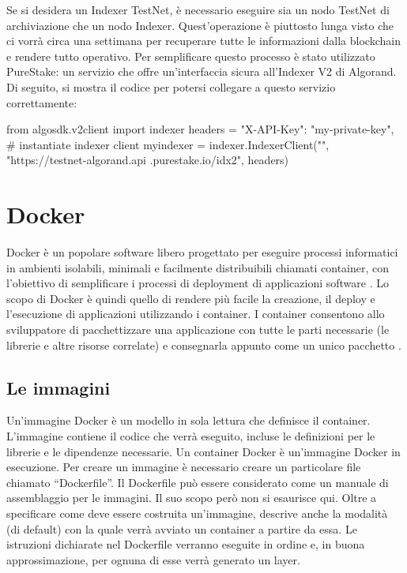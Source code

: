 Se si desidera un Indexer TestNet, è necessario eseguire sia un nodo TestNet di archiviazione che un nodo Indexer. Quest'operazione è piuttosto lunga visto che ci vorrà circa una settimana per recuperare tutte le informazioni dalla blockchain e rendere tutto operativo. Per semplificare questo processo è stato utilizzato PureStake: un servizio che offre un'interfaccia sicura all'Indexer V2 di Algorand. Di seguito, si mostra il codice per potersi collegare a questo servizio correttamente:

\begin{pythoncode}
from algosdk.v2client import indexer
headers = {
"X-API-Key": "my-private-key",
}
# instantiate indexer client
myindexer = indexer.IndexerClient("", "https://testnet-algorand.api
.purestake.io/idx2", headers)
\end{pythoncode}

\section{Docker}
Docker è un popolare software libero progettato per eseguire processi informatici in ambienti isolabili, minimali e facilmente distribuibili chiamati container, con l'obiettivo di semplificare i processi di deployment di applicazioni software \cite{docker}. Lo scopo di Docker è quindi quello di rendere più facile la creazione, il deploy e l'esecuzione di applicazioni utilizzando i container. I container consentono allo sviluppatore di pacchettizzare una applicazione con tutte le parti necessarie (le librerie e altre risorse correlate) e consegnarla appunto come un unico pacchetto \cite{docker1}.

\subsection{Le immagini}
Un'immagine Docker è un modello in sola lettura che definisce il container. L'immagine contiene il codice che verrà eseguito, incluse le definizioni per le librerie e le dipendenze necessarie. Un container Docker è un'immagine Docker in esecuzione. Per creare un immagine è necessario creare un particolare file chiamato “Dockerfile”. Il Dockerfile può essere considerato come un manuale di assemblaggio per le immagini. Il suo scopo però non si esaurisce qui. Oltre a specificare come deve essere costruita un’immagine, descrive anche la modalità (di default) con la quale verrà avviato un container a partire da essa. Le istruzioni dichiarate nel Dockerfile verranno eseguite in ordine e, in buona approssimazione, per ognuna di esse verrà generato un layer.

